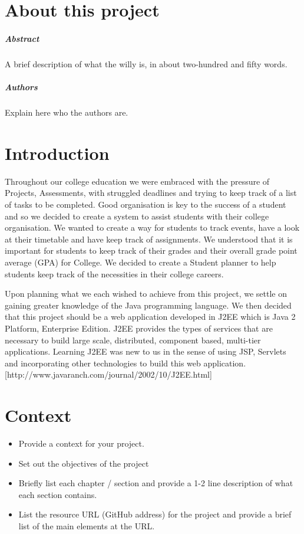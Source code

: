 
\chapter*{About this project}
\paragraph{Abstract}
A brief description of what the willy is, in about two-hundred and fifty words.

\paragraph{Authors}
Explain here who the authors are.



\chapter{Introduction}
Throughout our college education we were embraced with the pressure of Projects, Assessments, with struggled deadlines and trying to keep track of a list of tasks to be completed. Good organisation is key to the success of a student and so we decided to create a system to assist students with their college organisation. We wanted to create a way for students to track events, have a look at their timetable and have keep track of assignments. We understood that it is important for students to keep track of their grades and their overall grade point average (GPA) for College. We decided to create a Student planner to help students keep track of the necessities in their college careers. 

Upon planning what we each wished to achieve from this project, we settle on gaining greater knowledge of the Java programming language. We then decided that this project should be a web application developed in J2EE which is Java 2 Platform, Enterprise Edition. J2EE provides the types of services that are necessary to build large scale, distributed, component based, multi-tier applications. Learning J2EE was new to us in the sense of using JSP, Servlets and incorporating other technologies to build this web application.[http://www.javaranch.com/journal/2002/10/J2EE.html]

\chapter{Context}
\begin{itemize}
\item Provide a context for your project.
\item Set out the objectives of the project
\item Briefly list each chapter / section and provide a 1-2 line description of what each section contains.
\item List the resource URL (GitHub address) for the project and provide a brief list of the main elements at the URL.
\end{itemize}

